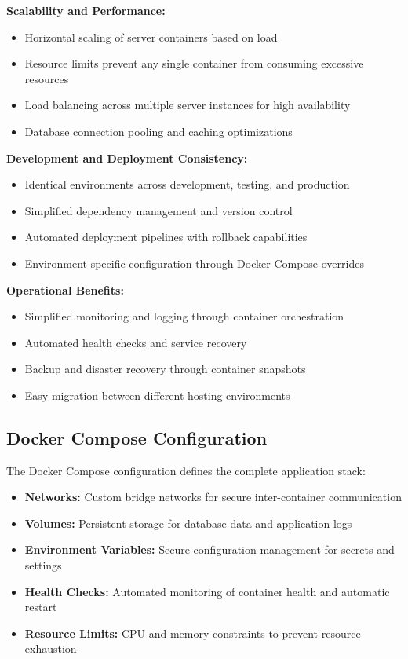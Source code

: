 \documentclass[12pt,a4paper,openany]{book}
\begin{document}
\textbf{Scalability and Performance:}
\begin{itemize}
\item Horizontal scaling of server containers based on load
\item Resource limits prevent any single container from consuming excessive resources
\item Load balancing across multiple server instances for high availability
\item Database connection pooling and caching optimizations
\end{itemize}

\textbf{Development and Deployment Consistency:}
\begin{itemize}
\item Identical environments across development, testing, and production
\item Simplified dependency management and version control
\item Automated deployment pipelines with rollback capabilities
\item Environment-specific configuration through Docker Compose overrides
\end{itemize}

\textbf{Operational Benefits:}
\begin{itemize}
\item Simplified monitoring and logging through container orchestration
\item Automated health checks and service recovery
\item Backup and disaster recovery through container snapshots
\item Easy migration between different hosting environments
\end{itemize}

\subsection{Docker Compose Configuration}

The Docker Compose configuration defines the complete application stack:

\begin{itemize}
\item \textbf{Networks:} Custom bridge networks for secure inter-container communication
\item \textbf{Volumes:} Persistent storage for database data and application logs
\item \textbf{Environment Variables:} Secure configuration management for secrets and settings
\item \textbf{Health Checks:} Automated monitoring of container health and automatic restart
\item \textbf{Resource Limits:} CPU and memory constraints to prevent resource exhaustion
\end{itemize}
\end{document}
